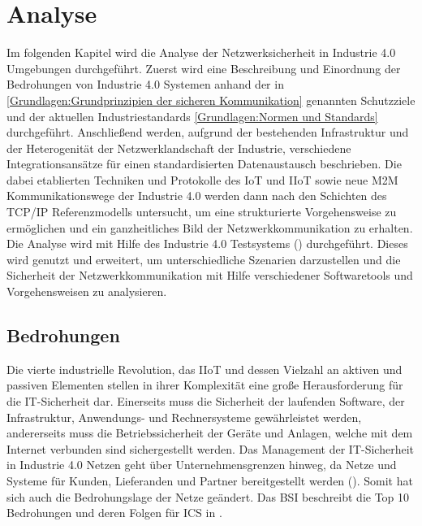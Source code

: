 \chapter{Analyse}
Im folgenden Kapitel wird die Analyse der Netzwerksicherheit in Industrie 4.0 Umgebungen durchgeführt. Zuerst wird eine Beschreibung und Einordnung der Bedrohungen von Industrie 4.0 Systemen anhand der in \autoref{Grundlagen:Grundprinzipien der sicheren Kommunikation} genannten Schutzziele und der aktuellen Industriestandards \autoref{Grundlagen:Normen und Standards} durchgeführt. Anschließend werden, aufgrund der bestehenden Infrastruktur und der Heterogenität der Netzwerklandschaft der Industrie, verschiedene Integrationsansätze für einen standardisierten Datenaustausch beschrieben. Die dabei etablierten Techniken und Protokolle des \ac{IoT} und \ac{IIoT} sowie neue \ac{M2M} Kommunikationswege der Industrie 4.0 werden dann nach den Schichten des \ac{TCP}/\ac{IP} Referenzmodells untersucht, um eine strukturierte Vorgehensweise zu ermöglichen und ein ganzheitliches Bild der Netzwerkkommunikation zu erhalten. Die Analyse wird mit Hilfe des Industrie 4.0 Testsystems (\cite{Weber2018}) durchgeführt. Dieses wird genutzt und erweitert, um unterschiedliche Szenarien darzustellen und die Sicherheit der Netzwerkkommunikation mit Hilfe verschiedener Softwaretools und Vorgehensweisen zu analysieren.

\section{Bedrohungen}
Die vierte industrielle Revolution, das \ac{IIoT} und dessen Vielzahl an aktiven und passiven Elementen stellen in ihrer Komplexität eine große Herausforderung für die IT-Sicherheit dar. Einerseits muss die Sicherheit der laufenden Software, der Infrastruktur, Anwendungs- und Rechnersysteme gewährleistet werden, andererseits muss die Betriebssicherheit der Geräte und Anlagen, welche mit dem Internet verbunden sind sichergestellt werden. Das Management der IT-Sicherheit in Industrie 4.0 Netzen geht über Unternehmensgrenzen hinweg, da Netze und Systeme für Kunden, Lieferanden und Partner bereitgestellt werden (\cite{DTAG2016}). Somit hat sich auch die Bedrohungslage der Netze geändert. Das \ac{BSI} beschreibt die Top 10 Bedrohungen und deren Folgen für \ac{ICS} in \cite{ICSSec2016}.

